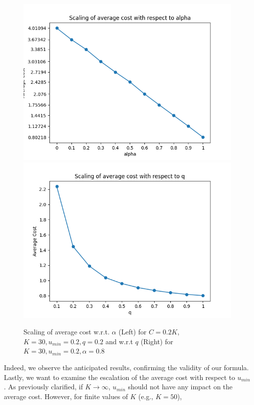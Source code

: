 \documentclass[12pt]{article}
\begin{document}
    \begin{figure}[H]
        \centering
        \includegraphics[scale = 0.5]{Figure_31.png}
        \includegraphics[scale = 0.5]{Figure_32.png}
        \caption{Scaling of average cost w.r.t. $\alpha$ (Left) for $C=0.2K$, $K=30, u_{min} = 0.2, q=0.2$ and w.r.t $q$ (Right) for $K=30, u_{min} = 0.2, \alpha=0.8$}
    \end{figure}
    Indeed, we observe the anticipated results, confirming the validity of our formula. Lastly, we want to examine the escalation of the average cost with respect to $u_{min}$. As previously clarified, if $K \rightarrow \infty$, $u_{min}$ should not have any impact on the average cost. However, for finite values of $K$ (e.g., $K=50$), 
\end{document}
